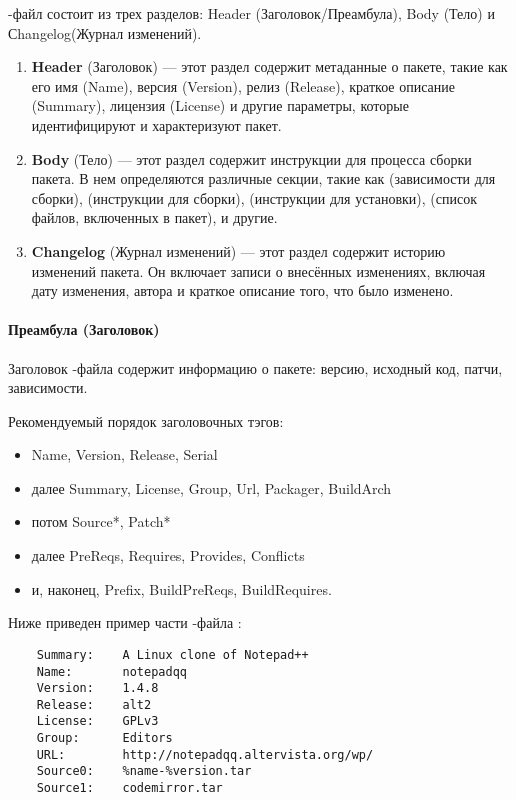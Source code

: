 -файл состоит из трех разделов: Header (Заголовок/Преамбула), Body (Тело) и Сhangelog(Журнал изменений).
\begin{enumerate}
	\item \textbf{Header} (Заголовок) --- этот раздел содержит метаданные о пакете, такие как его имя (Name), версия (Version), релиз (Release), краткое описание (Summary), лицензия (License) и другие параметры, которые идентифицируют и характеризуют пакет.
	
	\item \textbf{Body} (Тело) --- этот раздел содержит инструкции для процесса сборки пакета. В нем определяются различные секции, такие как  (зависимости для сборки),  (инструкции для сборки),  (инструкции для установки),  (список файлов, включенных в пакет), и другие.
	
	\item \textbf{Changelog} (Журнал изменений) --- этот раздел содержит историю изменений пакета. Он включает записи о внесённых изменениях, включая дату изменения, автора и краткое описание того, что было изменено.
\end{enumerate}

\paragraph{Преамбула (Заголовок)}
Заголовок -файла содержит информацию о пакете: версию, исходный код, патчи, зависимости.

Рекомендуемый порядок заголовочных тэгов:
\begin{itemize}
	\item Name, Version, Release, Serial
	\item далее Summary, License, Group, Url, Packager, BuildArch
	\item потом Source*, Patch*
	\item далее PreReqs, Requires, Provides, Conflicts
	\item и, наконец, Prefix, BuildPreReqs, BuildRequires.
\end{itemize}

Ниже приведен пример части -файла :
\begin{verbatim}
	Summary:	A Linux clone of Notepad++
	Name:		notepadqq
	Version:	1.4.8
	Release:	alt2
	License:	GPLv3
	Group:		Editors
	URL:		http://notepadqq.altervista.org/wp/
	Source0:	%name-%version.tar
	Source1:	codemirror.tar
\end{verbatim}